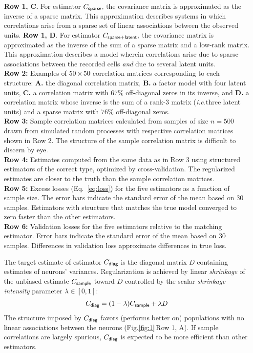 \documentclass[10pt]{article}
\newcommand{\figref}[2]{Fig.\;\ref{fig:#1}\,#2}
\newcommand{\ie}{\emph{i.e.}\;}
\begin{document}
\begin{FPfigure}
{        {\bf  Row 1, C}. For estimator $C_{\sf sparse}$, the covariance matrix is approximated as the inverse of a sparse matrix. This approximation describes systems in which correlations arise from a sparse set of  linear associations between the observed units. 
        {\bf  Row 1, D}.  For estimator $C_{\sf sparse+latent}$, the covariance matrix is approximated as the inverse of the sum of a sparse matrix and a low-rank matrix. This approximation describes a model wherein correlations arise due to sparse associations between the recorded cells \emph{and} due to several latent units. 
	\\
	{\bf Row 2:} Examples of $50\times 50$ correlation matrices corresponding to each structure: {\bf A.} the diagonal correlation matrix, {\bf B.} a factor model with four latent units, {\bf C.}  a correlation matrix with 67\%  off-diagonal zeros in its inverse, and {\bf  D.} a correlation matrix whose inverse is the sum of a rank-3 matrix (\ie three latent units) and a sparse matrix with 76\% off-diagonal zeros. 
\\
{\bf Row 3:} Sample correlation matrices calculated from samples of size $n=500$ drawn from simulated random processes with respective correlation matrices shown in Row 2.  The structure of the sample correlation matrix is difficult to discern by eye.
\\
{\bf Row 4:} Estimates computed from the same data as in Row 3 using structured estimators of the correct type, optimized by cross-validation.  The regularized estimates are closer to the truth than the sample correlation matrices.
\\
{\bf Row 5:} Excess losses (Eq.~\ref{eq:loss}) for the five estimators as a function of sample size. The error bars indicate the standard error of the mean based on 30 samples.  Estimators with structure that matches the true model converged to zero faster than the other estimators. 
\\
{\bf Row 6:} Validation losses for the five estimators relative to the matching estimator. Error bars indicate the standard error of the mean based on 30 samples.  Differences in validation loss approximate differences in true loss.
    }
    \label{fig:1}
\end{FPfigure} 

The target estimate of estimator $C_{\sf diag}$ is the diagonal matrix $D$ containing estimates of neurons' variances. Regularization is achieved by linear \emph{shrinkage} of the unbiased estimate $C_{\sf sample}$ toward $D$ controlled by the scalar \emph{shrinkage intensity} parameter $\lambda \in [0, 1]$:
\begin{equation}\label{eq:c-diag}
C_{\sf diag} = (1-\lambda) C_{\sf sample} + \lambda D
\end{equation}
The structure imposed by $C_{\sf diag}$ favors (performs better  on) populations   with no linear associations between the neurons (\figref{1}{Row 1, A}).  If sample correlations are largely spurious, $C_{\sf diag}$ is expected to be more efficient than other estimators. 
\end{document}
